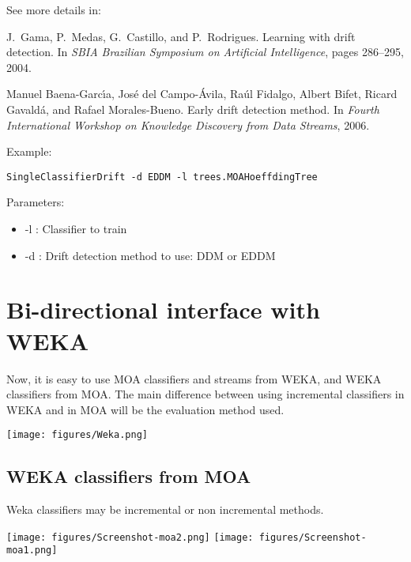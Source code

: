 \documentclass[a4paper,12pt,twoside]{book}
\begin{document}
See more details in:

\begin{itemize}
J.~Gama, P.~Medas, G.~Castillo, and P.~Rodrigues.
\newblock Learning with drift detection.
\newblock In {\em SBIA Brazilian Symposium on Artificial Intelligence}, pages
  286--295, 2004.

Manuel Baena-Garc\'{\i}a, Jos{\'e} del Campo-{\'A}vila, Ra\'ul Fidalgo, Albert
  Bifet, Ricard Gavald\'a, and Rafael Morales-Bueno.
\newblock Early drift detection method.
\newblock In {\em Fourth International Workshop on Knowledge Discovery from
  Data Streams}, 2006.\end{itemize}

Example:
\begin{footnotesize}\begin{verbatim}
SingleClassifierDrift -d EDDM -l trees.MOAHoeffdingTree
\end{verbatim}\end{footnotesize}

Parameters:
\begin{itemize}
\item -l : Classifier to train
\item -d : Drift detection method to use: DDM or EDDM
\end{itemize}



\chapter{Bi-directional interface with WEKA}
\label{chap:Weka}

Now, it is easy to use MOA classifiers and streams from WEKA, and WEKA classifiers from MOA.
The main difference between using incremental classifiers in WEKA and in MOA will be the evaluation method used.

\begin{center}
\texttt{[image: figures/Weka.png]}\end{center}

\section{WEKA classifiers from MOA}

Weka classifiers may be incremental or non incremental methods.

\begin{center}
\texttt{[image: figures/Screenshot-moa2.png]}
\texttt{[image: figures/Screenshot-moa1.png]}
\end{center}
\end{document}
